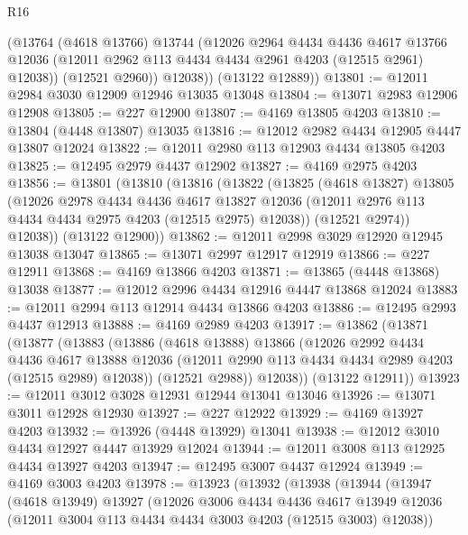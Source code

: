 \begin{lexlean}{R16}
\begin{coremodule}
          (@13764
            (@4618 @13766)
            @13744
            (@12026
              @2964
              @4434
              @4436
              @4617
              @13766
              @12036
              (@12011 @2962 @113 @4434 @4434 @2961 @4203 (@12515 @2961) @12038))
            (@12521 @2960))
          @12038))
      (@13122 @12889))
@13801 := @12011 @2984 @3030 @12909 @12946 @13035 @13048
@13804 := @13071 @2983 @12906 @12908
@13805 := @227 @12900
@13807 := @4169 @13805 @4203
@13810 := @13804 (@4448 @13807) @13035
@13816 := @12012 @2982 @4434 @12905 @4447 @13807 @12024
@13822 := @12011 @2980 @113 @12903 @4434 @13805 @4203
@13825 := @12495 @2979 @4437 @12902
@13827 := @4169 @2975 @4203
@13856 := @13801
    (@13810
      (@13816
        (@13822
          (@13825
            (@4618 @13827)
            @13805
            (@12026
              @2978
              @4434
              @4436
              @4617
              @13827
              @12036
              (@12011 @2976 @113 @4434 @4434 @2975 @4203 (@12515 @2975) @12038))
            (@12521 @2974))
          @12038))
      (@13122 @12900))
@13862 := @12011 @2998 @3029 @12920 @12945 @13038 @13047
@13865 := @13071 @2997 @12917 @12919
@13866 := @227 @12911
@13868 := @4169 @13866 @4203
@13871 := @13865 (@4448 @13868) @13038
@13877 := @12012 @2996 @4434 @12916 @4447 @13868 @12024
@13883 := @12011 @2994 @113 @12914 @4434 @13866 @4203
@13886 := @12495 @2993 @4437 @12913
@13888 := @4169 @2989 @4203
@13917 := @13862
    (@13871
      (@13877
        (@13883
          (@13886
            (@4618 @13888)
            @13866
            (@12026
              @2992
              @4434
              @4436
              @4617
              @13888
              @12036
              (@12011 @2990 @113 @4434 @4434 @2989 @4203 (@12515 @2989) @12038))
            (@12521 @2988))
          @12038))
      (@13122 @12911))
@13923 := @12011 @3012 @3028 @12931 @12944 @13041 @13046
@13926 := @13071 @3011 @12928 @12930
@13927 := @227 @12922
@13929 := @4169 @13927 @4203
@13932 := @13926 (@4448 @13929) @13041
@13938 := @12012 @3010 @4434 @12927 @4447 @13929 @12024
@13944 := @12011 @3008 @113 @12925 @4434 @13927 @4203
@13947 := @12495 @3007 @4437 @12924
@13949 := @4169 @3003 @4203
@13978 := @13923
    (@13932
      (@13938
        (@13944
          (@13947
            (@4618 @13949)
            @13927
            (@12026
              @3006
              @4434
              @4436
              @4617
              @13949
              @12036
              (@12011 @3004 @113 @4434 @4434 @3003 @4203 (@12515 @3003) @12038))

\end{coremodule}
\end{lexlean}
